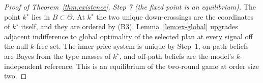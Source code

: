 \begin{proof}[Proof of Theorem~\ref{thm:existence}]
\emph{Step 7 (the fixed point is an equilibrium).} The point $k^\star$ lies in $B\subset\Theta$. At
$k^\star$ the two unique down-crossings are the coordinates of $k^\star$ itself, and they are
ordered by (B3). Lemma~\ref{lem:ex-global} upgrades adjacent indifference to global optimality of
the selected plan at every signal off the null $k$-free set. The inner price system is unique by Step~1, on-path beliefs are
Bayes from the type masses of $k^\star$, and off-path beliefs are the model's $k$-independent
reference. This is an equilibrium of the two-round game at order size two.
\end{proof}
